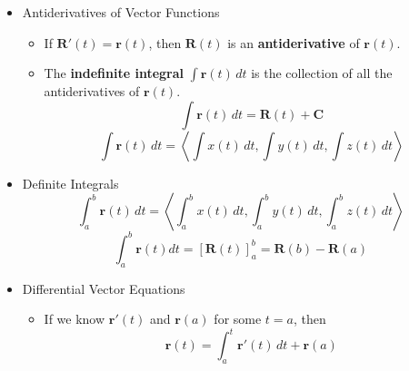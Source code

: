 \documentclass[12pt]{article}
\newcommand{\ds}{\displaystyle}
\renewcommand{\vec}[1]{\mathbf{#1}}
\newcommand{\dvar}[1]{\,d{#1}}
\newcommand{\<}{\left<}
\renewcommand{\>}{\right>}
\begin{document}
\begin{itemize}

    \item Antiderivatives of Vector Functions
      \begin{itemize}
        \item If $\vec{R}'(t)=\vec{r}(t)$, then $\vec{R}(t)$ is an \textbf{antiderivative} of $\vec{r}(t)$.
        \item The \textbf{indefinite integral} $\ds \int \vec{r}(t) \dvar{t}$ is the collection of all the antiderivatives of $\vec{r}(t)$.
        \[\ds\int \vec{r}(t) \dvar{t} = \vec{R}(t) + \vec{C}\]
        \[\ds\int \vec{r}(t) \dvar{t} = \<\int x(t) \dvar{t}, \int y(t) \dvar{t}, \int z(t) \dvar{t} \> \]
      \end{itemize}

    \item Definite Integrals
      \[\ds\int^b_a \vec{r}(t) \dvar{t} = \<\int^b_a x(t) \dvar{t}, \int^b_a y(t) \dvar{t}, \int^b_a z(t) \dvar{t} \> \]
      \[\int^b_a \vec{r}(t)dt = \left[\vec{R}(t)\right]^b_a=\vec{R}(b)-\vec{R}(a)\]

    \item Differential Vector Equations
      \begin{itemize}
      \item If we know $\vec{r}'(t)$ and $\vec{r}(a)$ for some $t=a$, then \[\vec{r}(t)=\int_a^t\vec{r}'(t)\,dt+\vec{r}(a)\]
      \end{itemize}
    

\end{itemize}
\end{document}

